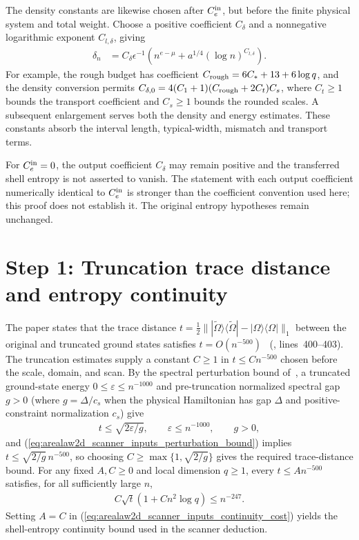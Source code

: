 \documentclass{article}
\begin{document}
The density constants are likewise chosen after $C_e^{\rm in}$, but
before the finite physical system and total weight. Choose a positive
coefficient $C_\delta$ and a nonnegative logarithmic exponent
$C_{l,\delta}$, giving
\begin{align}
    \delta_n
     & =C_\delta\epsilon^{-1}
    \left(n^{e-\mu}+a^{1/4}(\log n)^{C_{l,\delta}}\right).
    \label{eq:arealaw2d_scanner_inputs_density_bound}
\end{align}
For example, the rough budget has coefficient
$C_{\rm rough}=6C_*+13+6\log q$, and the density conversion permits
$C_{\delta,0}=4(C_1+1)(C_{\rm rough}+2C_t)C_s$, where $C_t\ge1$
bounds the transport coefficient and $C_s\ge1$ bounds the rounded
scales. A subsequent enlargement serves both the density and energy
estimates. These constants absorb the interval length, typical-width,
mismatch and transport terms.

For $C_e^{\rm in}=0$, the output coefficient $C_\delta$ may remain
positive and the transferred shell entropy is not asserted to vanish.
The statement with each output coefficient numerically identical to
$C_e^{\rm in}$ is stronger than the coefficient convention used here;
this proof does not establish it. The original entropy hypotheses remain
unchanged.

\section{Step 1: Truncation trace distance and entropy continuity}

The paper states that the trace distance $t=\frac12\||\widetilde\Omega\rangle
    \langle\widetilde\Omega|-|\Omega\rangle\langle\Omega|\|_1$ between the original
and truncated ground states satisfies $t=O(n^{-500})$~\cite{OpenAI2026AreaLaw}
(, lines~400--403). The truncation estimates supply
a constant $C\ge1$ in $t\le Cn^{-500}$ chosen before the scale,
domain, and scan. By the spectral perturbation bound of~\cite[Proposition~4.5]{OpenAI2026AreaLaw},
a truncated ground-state energy $0\le\varepsilon\le n^{-1000}$ and pre-truncation
normalized spectral gap $g>0$ (where $g=\Delta/c_s$ when the physical
Hamiltonian has gap $\Delta$ and positive-constraint normalization $c_s$) give
\begin{align}
    t\le\sqrt{2\varepsilon/g},\qquad
    \varepsilon\le n^{-1000},\qquad g>0,
    \label{eq:arealaw2d_scanner_inputs_perturbation_bound}
\end{align}
and (\ref{eq:arealaw2d_scanner_inputs_perturbation_bound}) implies
$t\le\sqrt{2/g}\,n^{-500}$, so choosing $C\ge\max\{1,\sqrt{2/g}\}$
gives the required trace-distance bound.
For any fixed $A,C\ge0$ and local dimension $q\ge1$, every $t\le An^{-500}$
satisfies, for all sufficiently large $n$,
\begin{align}
    C\sqrt t(1+Cn^2\log q)\le n^{-247}.
    \label{eq:arealaw2d_scanner_inputs_continuity_cost}
\end{align}
Setting $A=C$ in (\ref{eq:arealaw2d_scanner_inputs_continuity_cost}) yields the
shell-entropy continuity bound used in the scanner deduction.
\end{document}
